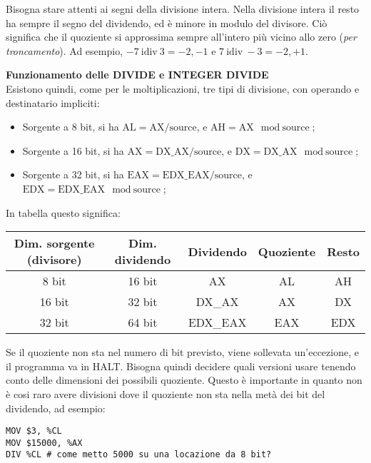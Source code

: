 \documentclass[a4paper,11pt]{article}
\begin{document}
Bisogna stare attenti ai segni della divisione intera.
Nella divisione intera il resto ha sempre il segno del dividendo, ed è minore in modulo del divisore.
Ciò significa che il quoziente si approssima sempre all'intero più vicino allo zero (\textit{per troncamento}).
Ad esempio, $-7 \ \mathrm{idiv} \ 3 = -2, -1$ e $7 \ \mathrm{idiv} \ -3 = -2, +1$.

\par\medskip
\noindent
\textbf{\textsf{Funzionamento delle DIVIDE e INTEGER DIVIDE}} \\
Esistono quindi, come per le moltiplicazioni, tre tipi di divisione, con operando e destinatario impliciti:
\begin{itemize}
	\item Sorgente a 8 bit, si ha $\text{AL} = \text{AX} / \text{source}$, e $ \text{AH} = \text{AX} \mod \text{source} $;
	\item Sorgente a 16 bit, si ha $\text{AX} = \text{DX\_AX} / \text{source}$, e $ \text{DX} = \text{DX\_AX} \mod \text{source} $;
	\item Sorgente a 32 bit, si ha $\text{EAX} = \text{EDX\_EAX} / \text{source}$, e $ \text{EDX} = \text{EDX\_EAX} \mod \text{source} $;
\end{itemize}

In tabella questo significa:

\begin{table}[h!]
	\center {}
	\begin{tabular} { c | c | c | c | c }
		\bfseries Dim. sorgente (divisore) & \bfseries Dim. dividendo & \bfseries Dividendo & \bfseries Quoziente & \bfseries Resto \\ 
		\hline 
		8 bit & 16 bit & AX & AL & AH \\ 
		16 bit & 32 bit & DX\_AX & AX & DX \\ 
		32 bit & 64 bit & EDX\_EAX & EAX & EDX
	\end{tabular}
\end{table}

Se il quoziente non sta nel numero di bit previsto, viene sollevata un'eccezione, e il programma va in HALT.
Bisogna quindi decidere quali versioni usare tenendo conto delle dimensioni dei possibili quoziente.
Questo è importante in quanto non è cosi raro avere divisioni dove il quoziente non sta nella metà dei bit del dividendo, ad esempio:

\begin{lstlisting}[language=assembler,style=codestyle]	
MOV $3, %CL
MOV $15000, %AX
DIV %CL	# come metto 5000 su una locazione da 8 bit?
\end{lstlisting}
\end{document}
